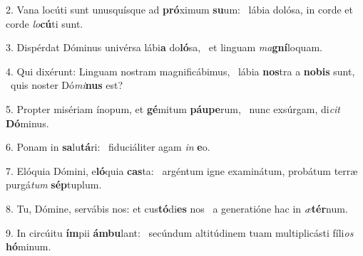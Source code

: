 2. Vana locúti sunt unusquísque ad \textbf{pró}ximum \textbf{su}um: \ast\  lábia dolósa, in corde et corde \textit{lo}\textbf{cú}ti sunt.\

3. Dispérdat Dóminus univérsa lábi\textbf{a} do\textbf{ló}sa, \ast\  et linguam \textit{ma}\textbf{gní}loquam.\

4. Qui dixérunt: Linguam nostram magnificábimus, \dag\  lábia \textbf{nos}tra a \textbf{no}\textbf{bis} sunt, \ast\  quis noster Dó\textit{mi}\textbf{nus} est?\

5. Propter misériam ínopum, et \textbf{gé}mitum \textbf{páu}\textbf{pe}rum, \ast\  nunc exsúrgam, di\textit{cit} \textbf{Dó}minus.\

6. Ponam in \textbf{sa}lu\textbf{tá}ri: \ast\  fiduciáliter agam \textit{in} \textbf{e}o.\

7. Elóquia Dómini, e\textbf{ló}quia \textbf{cas}ta: \ast\  argéntum igne examinátum, probátum terræ purgá\textit{tum} \textbf{sép}tuplum.\

8. Tu, Dómine, servábis nos: et cus\textbf{tó}di\textbf{es} nos \ast\  a generatióne hac in \textit{æ}\textbf{tér}num.\

9. In circúitu \textbf{ím}pii \textbf{ám}\textbf{bu}lant: \ast\  secúndum altitúdinem tuam multiplicásti fíli\textit{os} \textbf{hó}minum.\

